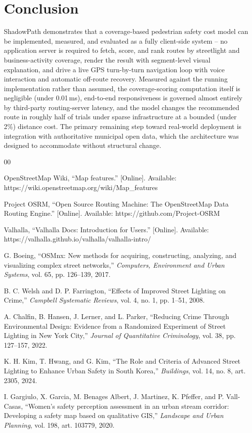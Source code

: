 \documentclass[conference]{IEEEtran}
\begin{document}
\section{Conclusion}

ShadowPath demonstrates that a coverage-based pedestrian safety cost model can be implemented, measured, and evaluated as a fully client-side system -- no application server is required to fetch, score, and rank routes by streetlight and business-activity coverage, render the result with segment-level visual explanation, and drive a live GPS turn-by-turn navigation loop with voice interaction and automatic off-route recovery. Measured against the running implementation rather than assumed, the coverage-scoring computation itself is negligible (under 0.01\,ms), end-to-end responsiveness is governed almost entirely by third-party routing-server latency, and the model changes the recommended route in roughly half of trials under sparse infrastructure at a bounded (under 2\%) distance cost. The primary remaining step toward real-world deployment is integration with authoritative municipal open data, which the architecture was designed to accommodate without structural change.

\begin{thebibliography}{00}

 OpenStreetMap Wiki, ``Map features.'' [Online]. Available: https://wiki.openstreetmap.org/wiki/Map\_features

 Project OSRM, ``Open Source Routing Machine: The OpenStreetMap Data Routing Engine.'' [Online]. Available: https://github.com/Project-OSRM

 Valhalla, ``Valhalla Docs: Introduction for Users.'' [Online]. Available: https://valhalla.github.io/valhalla/valhalla-intro/

 G. Boeing, ``OSMnx: New methods for acquiring, constructing, analyzing, and visualizing complex street networks,'' \emph{Computers, Environment and Urban Systems}, vol. 65, pp. 126--139, 2017.

 B. C. Welsh and D. P. Farrington, ``Effects of Improved Street Lighting on Crime,'' \emph{Campbell Systematic Reviews}, vol. 4, no. 1, pp. 1--51, 2008.

 A. Chalfin, B. Hansen, J. Lerner, and L. Parker, ``Reducing Crime Through Environmental Design: Evidence from a Randomized Experiment of Street Lighting in New York City,'' \emph{Journal of Quantitative Criminology}, vol. 38, pp. 127--157, 2022.

 K. H. Kim, T. Hwang, and G. Kim, ``The Role and Criteria of Advanced Street Lighting to Enhance Urban Safety in South Korea,'' \emph{Buildings}, vol. 14, no. 8, art. 2305, 2024.

 I. Gargiulo, X. Garcia, M. Benages Albert, J. Martinez, K. Pfeffer, and P. Vall-Casas, ``Women's safety perception assessment in an urban stream corridor: Developing a safety map based on qualitative GIS,'' \emph{Landscape and Urban Planning}, vol. 198, art. 103779, 2020.

\end{thebibliography}
\end{document}
